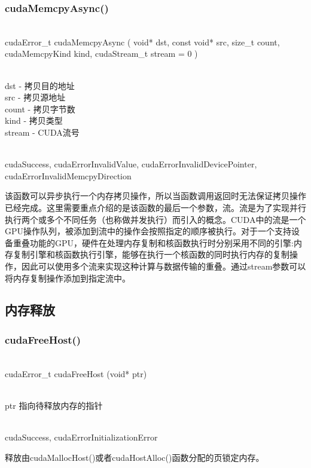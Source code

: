 \subsubsection{cudaMemcpyAsync()}
\begin{cnfrmfunc}
   \item{}\\
     ​cudaError\_t cudaMemcpyAsync ( void* dst, const void* src, size\_t count, cudaMemcpyKind kind, cudaStream\_t stream = 0 )
   \item{}\\
     dst - 拷贝目的地址\\
     src - 拷贝源地址\\
     count - 拷贝字节数\\
     kind - 拷贝类型\\
     stream - CUDA流号
   \item{}\\
     cudaSuccess, cudaErrorInvalidValue, cudaErrorInvalidDevicePointer, cudaErrorInvalidMemcpyDirection
\end{cnfrmfunc}
该函数可以异步执行一个内存拷贝操作，所以当函数调用返回时无法保证拷贝操作已经完成。这里需要重点介绍的是该函数的最后一个参数，流。流是为了实现并行执行两个或多个不同任务（也称做并发执行）而引入的概念。CUDA中的流是一个GPU操作队列，被添加到流中的操作会按照指定的顺序被执行。对于一个支持设备重叠功能的GPU，硬件在处理内存复制和核函数执行时分别采用不同的引擎:内存复制引擎和核函数执行引擎，能够在执行一个核函数的同时执行内存的复制操作，因此可以使用多个流来实现这种计算与数据传输的重叠。通过stream参数可以将内存复制操作添加到指定流中。
\subsection{内存释放}\label{cuda/mem/free}
\subsubsection{cudaFreeHost()}
\begin{cnfrmfunc}
   \item{}\\
    cudaError\_t cudaFreeHost (void* ptr)
   \item{}\\
     ptr 指向待释放内存的指针
   \item{}\\
     cudaSuccess, cudaErrorInitializationError
\end{cnfrmfunc}
释放由cudaMallocHost()或者cudaHostAlloc()函数分配的页锁定内存。
